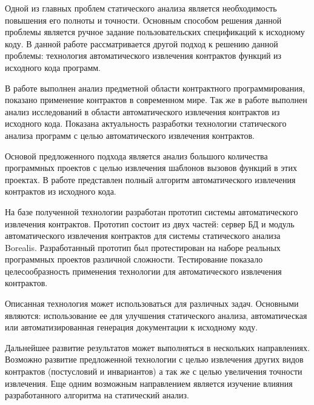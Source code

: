 \conclusion
Одной из главных проблем статического анализа является необходимость повышения его полноты и точности. Основным способом решения данной проблемы является ручное задание пользовательских спецификаций к исходному коду. В данной работе рассматривается другой подход к решению данной проблемы: технология автоматического извлечения контрактов функций из исходного кода программ.

В работе выполнен анализ предметной области контрактного программирования, показано применение контрактов в современном мире. Так же в работе выполнен анализ исследований в области автоматического извлечения контрактов из исходного кода. Показана актуальность разработки технологии статического анализа программ с целью автоматического извлечения контрактов.

Основой предложенного подхода является анализ большого количества программных проектов с целью извлечения шаблонов вызовов функций в этих проектах. В работе представлен полный алгоритм автоматического извлечения контрактов из исходного кода.

На базе полученной технологии разработан прототип системы автоматического извлечения контрактов. Прототип состоит из двух частей: сервер БД и модуль автоматического извлечения контрактов для системы статического анализа Borealis. Разработанный прототип был протестирован на наборе реальных программных проектов различной сложности. Тестирование показало целесообразность применения технологии для автоматического извлечения контрактов.

Описанная технология может использоваться для различных задач. Основными являются: использование ее для улучшения статического анализа, автоматическая или автоматизированная генерация документации к исходному коду.

Дальнейшее развитие результатов может выполняться в нескольких направлениях. Возможно развитие предложенной технологии с целью извлечения других видов контрактов (постусловий и инвариантов) а так же с целью увеличения точности извлечения. Еще одним возможным направлением является изучение влияния разработанного алгоритма на статический анализ.